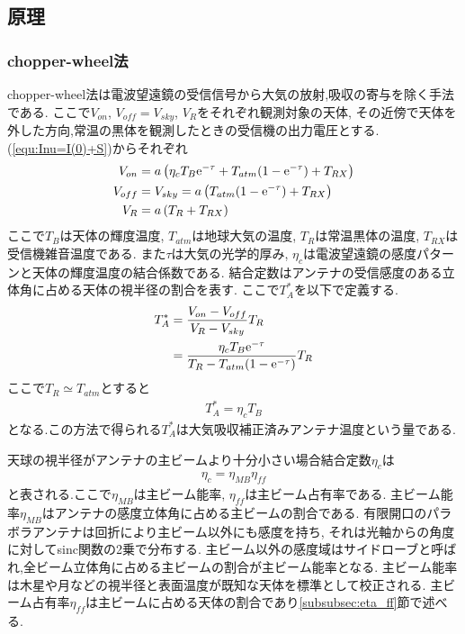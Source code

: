\subsection{原理}
\subsubsection{chopper-wheel法}
chopper-wheel法は電波望遠鏡の受信信号から大気の放射,吸収の寄与を除く手法である.
ここで$V_{on}$, $V_{off}=V_{sky}$, $V_{R}$をそれぞれ観測対象の天体,
その近傍で天体を外した方向,常温の黒体を観測したときの受信機の出力電圧とする.
(\ref{equ:Inu=I(0)+S})からそれぞれ
\begin{align}
  V_{on}&=a\left(\eta_cT_B{\rm e}^{-\tau}+T_{atm}(1-{\rm e}^{-\tau})+T_{RX}\right)\\
  V_{off}&=V_{sky}=a\left(T_{atm}(1-{\rm e}^{-\tau})+T_{RX}\right)\\
  V_{R}&=a\left(T_R+T_{RX}\right)
\end{align}
ここで$T_B$は天体の輝度温度, $T_{atm}$は地球大気の温度, $T_R$は常温黒体の温度, $T_{RX}$は受信機雑音温度である.
また$\tau$は大気の光学的厚み, $\eta_c$は電波望遠鏡の感度パターンと天体の輝度温度の結合係数である.
結合定数はアンテナの受信感度のある立体角に占める天体の視半径の割合を表す.
ここで$T_A^{*}$を以下で定義する.
\begin{align}
  T_A^{*}&=\frac{V_{on}-V_{off}}{V_R-V_{sky}}T_R\nonumber\\
  &=\frac{\eta_cT_B{\rm e}^{-\tau}}{T_R-T_{atm}(1-{\rm e}^{-\tau})}T_R\nonumber
\end{align}
ここで$T_R\simeq T_{atm}$とすると
\begin{align}
  T_A^{*}=\eta_c T_B
\end{align}
となる.この方法で得られる$T_A^{*}$は大気吸収補正済みアンテナ温度という量である.

天球の視半径がアンテナの主ビームより十分小さい場合結合定数$\eta_c$は
\begin{align}
  \eta_c=\eta_{MB}\eta_{ff}
\end{align}
と表される.ここで$\eta_{MB}$は主ビーム能率, $\eta_{ff}$は主ビーム占有率である.
主ビーム能率$\eta_{MB}$はアンテナの感度立体角に占める主ビームの割合である.
有限開口のパラボラアンテナは回折により主ビーム以外にも感度を持ち,
それは光軸からの角度に対してsinc関数の2乗で分布する.
主ビーム以外の感度域はサイドローブと呼ばれ,全ビーム立体角に占める主ビームの割合が主ビーム能率となる.
主ビーム能率は木星や月などの視半径と表面温度が既知な天体を標準として校正される.
主ビーム占有率$\eta_{ff}$は主ビームに占める天体の割合であり\ref{subsubsec:eta_ff}節で述べる.
